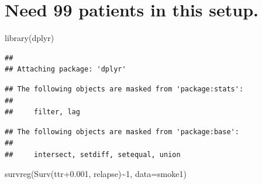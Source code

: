 \documentclass[
]{article}
\newenvironment{Shaded}{\begin{snugshade}}{\end{snugshade}}
\newcommand{\AttributeTok}[1]{\textcolor[rgb]{0.77,0.63,0.00}{#1}}
\newcommand{\DecValTok}[1]{\textcolor[rgb]{0.00,0.00,0.81}{#1}}
\newcommand{\FloatTok}[1]{\textcolor[rgb]{0.00,0.00,0.81}{#1}}
\newcommand{\FunctionTok}[1]{\textcolor[rgb]{0.00,0.00,0.00}{#1}}
\newcommand{\NormalTok}[1]{#1}
\newcommand{\OtherTok}[1]{\textcolor[rgb]{0.56,0.35,0.01}{#1}}
\newcommand{\SpecialCharTok}[1]{\textcolor[rgb]{0.00,0.00,0.00}{#1}}
\newcommand{\StringTok}[1]{\textcolor[rgb]{0.31,0.60,0.02}{#1}}
\begin{document}
\hypertarget{need-99-patients-in-this-setup.}{%
\section{Need 99 patients in this
setup.}\label{need-99-patients-in-this-setup.}}

\begin{Shaded}
\begin{Highlighting}[]
\FunctionTok{library}\NormalTok{(dplyr)}
\end{Highlighting}
\end{Shaded}

\begin{verbatim}
## 
## Attaching package: 'dplyr'
\end{verbatim}

\begin{verbatim}
## The following objects are masked from 'package:stats':
## 
##     filter, lag
\end{verbatim}

\begin{verbatim}
## The following objects are masked from 'package:base':
## 
##     intersect, setdiff, setequal, union
\end{verbatim}

\begin{Shaded}
\end{Shaded}

\begin{Shaded}
\begin{Highlighting}[]
\FunctionTok{survreg}\NormalTok{(}\FunctionTok{Surv}\NormalTok{(ttr}\FloatTok{+0.001}\NormalTok{, relapse)}\SpecialCharTok{\textasciitilde{}}\DecValTok{1}\NormalTok{, }
        \AttributeTok{data=}\NormalTok{smoke1)}
\end{Highlighting}
\end{Shaded}
\end{document}
